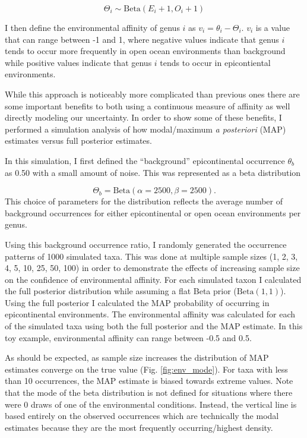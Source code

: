 \documentclass[12pt,letterpaper]{article}
\begin{document}
\begin{equation}
  \Theta_{i} \sim \mathrm{Beta}(E_{i} + 1, O_{i} + 1)
  \label{eq:bck_post}
\end{equation}

I then define the environmental affinity of genus \(i\) as \(v_{i} = \theta_{i} - \Theta_{i}\). \(v_{i}\) is a value that can range between -1 and 1, where negative values indicate that genus \(i\) tends to occur more frequently in open ocean environments than background while positive values indicate that genus \(i\) tends to occur in epicontiental environments.

While this approach is noticeably more complicated than previous ones \citep{Foote2006,Miller2001,Simpson2009,Kiessling2007a} there are some important benefits to both using a continuous measure of affinity as well directly modeling our uncertainty. In order to show some of these benefits, I performed a simulation analysis of how modal/maximum \textit{a posteriori} (MAP) estimates versus full posterior estimates.

In this simulation, I first defined the ``background'' epicontinental occurrence \(\theta_{b}\) as 0.50 with a small amount of noise. This was represented as a beta distribution 

\begin{equation}
  \Theta_{b} = \mathrm{Beta}(\alpha = 2500, \beta = 2500). 
  \label{eq:bck_sim}
\end{equation}
This choice of parameters for the distribution reflects the average number of background occurrences for either epicontinental or open ocean environments per genus.

Using this background occurrence ratio, I randomly generated the occurrence patterns of 1000 simulated taxa. This was done at multiple sample sizes (1, 2, 3, 4, 5, 10, 25, 50, 100) in order to demonstrate the effects of increasing sample size on the confidence of environmental affinity. For each simulated taxon I calculated the full posterior distribution while assuming a flat Beta prior (\(\mathrm{Beta}(1, 1)\)). Using the full posterior I calculated the MAP probability of occurring in epicontinental environments. The environmental affinity was calculated for each of the simulated taxa using both the full posterior and the MAP estimate. In this toy example, environmental affinity can range between -0.5 and 0.5.

As should be expected, as sample size increases the distribution of MAP estimates converge on the true value (Fig. \ref{fig:env_mode}). For taxa with less than 10 occurrences, the MAP estimate is biased towards extreme values. Note that the mode of the beta distribution is not defined for situations where there were 0 draws of one of the environmental conditions. Instead, the vertical line is based entirely on the observed occurrences which are technically the modal estimates because they are the most frequently occurring/highest density.
\end{document}
